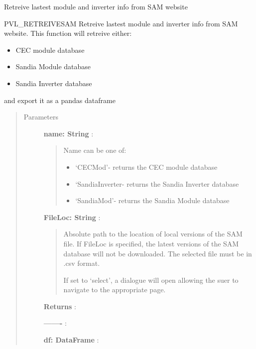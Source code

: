 \documentclass[letterpaper,10pt,english]{sphinxmanual}
\begin{document}
\begin{fulllineitems}
\label{stubs/pvlib.pvl_retreiveSAM:pvlib.pvl_retreiveSAM}
Retreive lastest module and inverter info from SAM website

PVL\_RETREIVESAM Retreive lastest module and inverter info from SAM website.
This function will retreive either:
\begin{itemize}
\item {} 
CEC module database

\item {} 
Sandia Module database

\item {} 
Sandia Inverter database

\end{itemize}

and export it as a pandas dataframe
\begin{quote}\begin{description}
\item[{Parameters}] \leavevmode
\textbf{name: String} :
\begin{quote}

Name can be one of:
\begin{itemize}
\item {} 
`CECMod'- returns the CEC module database

\item {} 
`SandiaInverter- returns the Sandia Inverter database

\item {} 
`SandiaMod'- returns the Sandia Module database

\end{itemize}
\end{quote}

\textbf{FileLoc: String} :
\begin{quote}

Absolute path to the location of local versions of the SAM file. 
If FileLoc is specified, the latest versions of the SAM database will
not be downloaded. The selected file must be in .csv format.

If set to `select', a dialogue will open allowing the suer to navigate 
to the appropriate page.
\end{quote}

\textbf{Returns} :

\textbf{-------} :

\textbf{df: DataFrame} :
\begin{quote}


\end{quote}
\end{description}
\end{quote}
\end{fulllineitems}
\end{document}
